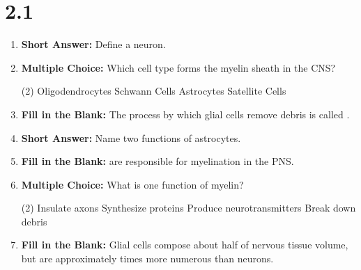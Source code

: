 \section*{2.1}
\begin{enumerate}[label=\textbf{Q2.1.\arabic*}]
      \item \textbf{Short Answer:} Define a neuron. \\
      \item \textbf{Multiple Choice:} Which cell type forms the myelin sheath in the CNS?
            \begin{tasks}[label=\textcolor{\documentTheme}{(\Alph*)}, item-format=\color{\documentTheme}, label-width=1.5em, item-indent=1.7em](2)
                  \task Oligodendrocytes
                  \task Schwann Cells
                  \task Astrocytes
                  \task Satellite Cells
            \end{tasks}
      \item \textbf{Fill in the Blank:} The process by which glial cells remove debris is called \underline{\hspace{3cm}}. \\
      \item \textbf{Short Answer:} Name two functions of astrocytes. \\
      \item \textbf{Fill in the Blank:} \underline{\hspace{3cm}} are responsible for myelination in the PNS. \\
      \item \textbf{Multiple Choice:} What is one function of myelin?
            \begin{tasks}[label=\textcolor{\documentTheme}{(\Alph*)}, item-format=\color{\documentTheme}, label-width=1.5em, item-indent=1.7em](2)
                  \task Insulate axons
                  \task Synthesize proteins
                  \task Produce neurotransmitters
                  \task Break down debris
            \end{tasks}
      \item \textbf{Fill in the Blank:} Glial cells compose about half of nervous tissue volume, but are approximately \underline{\hspace{3cm}} times more numerous than neurons. \\


\end{enumerate}
